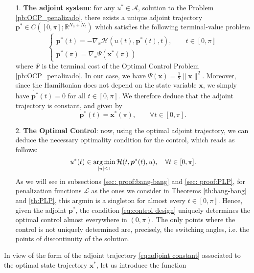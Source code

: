 \documentclass[twocolumn]{autart}    %
\begin{document}
\begin{itemize}
	\item[1.] \textbf{The adjoint system}: for any $u^\ast \in \mathcal{A}$, solution to the Problem \ref{pb:OCP_penalizado}, there exists a unique adjoint trajectory $\bm{p}^\ast\in C([0,\pi]; \mathbb{R}^{N_a+N_b})$ which satisfies the following terminal-value problem
    \begin{equation*}
    	\begin{cases}
    		\dot{\bm{p}^\ast}(t) = -\nabla_x \mathcal{H}(u(t),\bm{p}^\ast(t),t), \qquad t \in [0,\pi] 
    		\\[5pt]
    		\bm{p}^\ast (\pi) = \nabla_x \Psi (\bm{x}^\ast (\pi))
    	\end{cases}
    \end{equation*}
    where $\Psi$ is the terminal cost of the Optimal Control Problem \ref{pb:OCP_penalizado}. In our case, we have $\Psi (\bm{x}) = \frac{1}{2} \| \bm{x}\|^2$. Moreover, since the Hamiltonian does not depend on the state variable $\bm{x}$, we simply have $\dot{\bm{p}^\ast}(t) = 0$ for all $t \in [0,\pi]$. We therefore deduce that the adjoint trajectory is constant, and given by
    \begin{equation}\label{eq:adjoint constant}
		\bm{p}^\ast (t) = \bm{x}^\ast (\pi), \qquad \forall t \in [0,\pi]. 
	\end{equation}
    
    \item[2.] \textbf{The Optimal  Control}: now, using the optimal adjoint trajectory, we can deduce the necessary optimality condition for the control, which reads as follows:
    \begin{align}\label{eq:control design}
    	u^* (t) \in \operatorname*{arg\,min}_{|u|\leq 1} \mathcal{H}(t,\bm{p}^*(t),u), \quad \forall t \in [0,\pi].
    \end{align}
    As we will see in subsections \ref{sec: proof:bang-bang} and \ref{sec: proof:PLP}, for penalization functions $\mathcal{L}$ as the ones we consider in Theorems \ref{th:bang-bang} and \ref{th:PLP}, this argmin is a singleton for almost every $t\in [0,\pi]$.  
    Hence, given the adjoint $\bm{p}^\ast$,  the condition \eqref{eq:control design} uniquely determines the optimal control almost everywhere in $(0,\pi)$. The only points where the control is not uniquely determined are, precisely, the switching angles, i.e. the points of discontinuity of the solution.
\end{itemize}
In view of the form of the adjoint trajectory \eqref{eq:adjoint constant} associated to the optimal state trajectory $\bm{x}^\ast$, let us introduce the function
\end{document}
